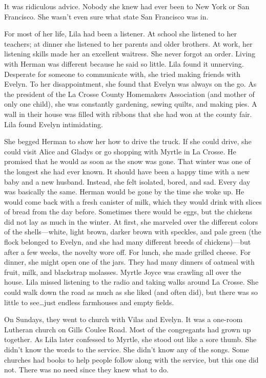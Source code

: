 \documentclass[
  american,
  letterpaper,
]{book}
\begin{document}
It was ridiculous advice. Nobody she knew had ever been to New York or
San Francisco. She wasn't even sure what state San Francisco was in.

For most of her life, Lila had been a listener. At school she listened
to her teachers; at dinner she listened to her parents and older
brothers. At work, her listening skills made her an excellent waitress.
She never forgot an order. Living with Herman was different because he
said so little. Lila found it unnerving. Desperate for someone to
communicate with, she tried making friends with Evelyn. To her
disappointment, she found that Evelyn was always on the go. As the
president of the La Crosse County Homemakers Association (and mother of
only one child), she was constantly gardening, sewing quilts, and making
pies. A wall in their house was filled with ribbons that she had won at
the county fair. Lila found Evelyn intimidating.

She begged Herman to show her how to drive the truck. If she could
drive, she could visit Alice and Gladys or go shopping with Myrtle in La
Crosse. He promised that he would as soon as the snow was gone. That
winter was one of the longest she had ever known. It should have been a
happy time with a new baby and a new husband. Instead, she felt
isolated, bored, and sad. Every day was basically the same. Herman would
be gone by the time she woke up. He would come back with a fresh
canister of milk, which they would drink with slices of bread from the
day before. Sometimes there would be eggs, but the chickens did not lay
as much in the winter. At first, she marveled over the different colors
of the shells---white, light brown, darker brown with speckles, and pale
green (the flock belonged to Evelyn, and she had many different breeds
of chickens)---but after a few weeks, the novelty wore off. For lunch,
she made grilled cheese. For dinner, she might open one of the jars.
They had many dinners of oatmeal with fruit, milk, and blackstrap
molasses. Myrtle Joyce was crawling all over the house. Lila missed
listening to the radio and taking walks around La Crosse. She could walk
down the road as much as she liked (and often did), but there was so
little to see\ldots just endless farmhouses and empty fields.

On Sundays, they went to church with Vilas and Evelyn. It was a one-room
Lutheran church on Gills Coulee Road. Most of the congregants had grown
up together. As Lila later confessed to Myrtle, she stood out like a
sore thumb. She didn't know the words to the service. She didn't know
any of the songs. Some churches had books to help people follow along
with the service, but this one did not. There was no need since they
knew what to do.
\end{document}
